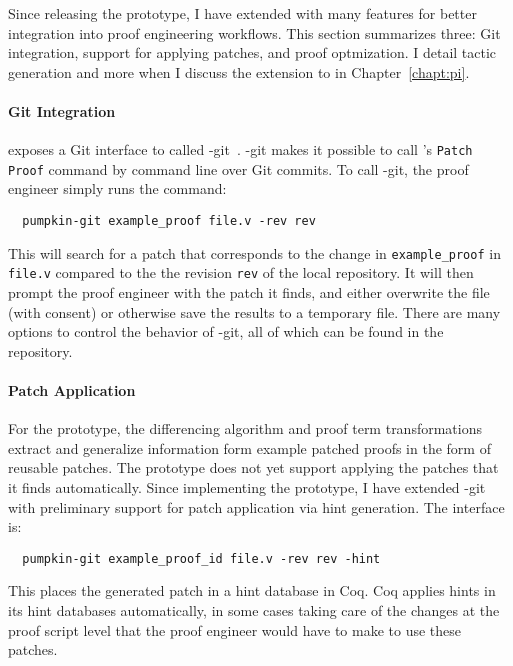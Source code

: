 Since releasing the \sysname prototype, I have extended \sysname with many features
for better integration into proof engineering workflows.
This section summarizes three: Git integration, support for applying patches,
and proof optmization.
I detail tactic generation and more when I discuss the \toolnamec extension to \sysnamelong
in Chapter~\ref{chapt:pi}.

\paragraph{Git Integration} \sysnamelong exposes a Git interface to \sysname
called \sysname-git~\cite{pumpkin-git}.
\sysname-git makes it possible to call \sysname's \lstinline{Patch Proof} command by command line over Git commits.
To call \sysname-git, the proof engineer simply runs the command:

\begin{lstlisting}
  pumpkin-git example_proof file.v -rev rev
\end{lstlisting}
This will search for a patch that corresponds to the change in \lstinline{example_proof} in \lstinline{file.v} compared to the the revision \lstinline{rev}
of the local repository. It will then prompt the proof engineer with the patch it finds, and either overwrite the file (with consent) 
or otherwise save the results to a temporary file. There are many options to control the behavior of \sysname-git,
all of which can be found in the repository.

\paragraph{Patch Application}
For the \sysname prototype, the differencing algorithm and proof term transformations extract and generalize information form example patched proofs
in the form of reusable patches. The prototype does not yet support applying the patches that it finds automatically.
Since implementing the prototype, I have extended \sysname-git with preliminary support for patch application via hint generation.
The interface is: %

\begin{lstlisting}
  pumpkin-git example_proof_id file.v -rev rev -hint
\end{lstlisting}
This places the generated patch in a hint database in Coq.
Coq applies hints in its hint databases automatically, in some cases taking care of the changes at the proof script level
that the proof engineer would have to make to use these patches.

